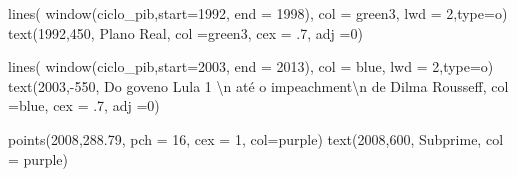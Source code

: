 \documentclass[
  letterpaper,
  DIV=11,
  numbers=noendperiod]{scrartcl}
\newenvironment{Shaded}{\begin{snugshade}}{\end{snugshade}}
\newcommand{\AttributeTok}[1]{\textcolor[rgb]{0.40,0.45,0.13}{#1}}
\newcommand{\DecValTok}[1]{\textcolor[rgb]{0.68,0.00,0.00}{#1}}
\newcommand{\FloatTok}[1]{\textcolor[rgb]{0.68,0.00,0.00}{#1}}
\newcommand{\FunctionTok}[1]{\textcolor[rgb]{0.28,0.35,0.67}{#1}}
\newcommand{\NormalTok}[1]{\textcolor[rgb]{0.00,0.23,0.31}{#1}}
\newcommand{\SpecialCharTok}[1]{\textcolor[rgb]{0.37,0.37,0.37}{#1}}
\newcommand{\StringTok}[1]{\textcolor[rgb]{0.13,0.47,0.30}{#1}}
\theoremstyle{definition}
\theoremstyle{definition}
\theoremstyle{plain}
\theoremstyle{plain}
\theoremstyle{remark}
\begin{document}
\begin{Shaded}
\begin{Highlighting}[]
\FunctionTok{lines}\NormalTok{( }\FunctionTok{window}\NormalTok{(ciclo\_pib,}\AttributeTok{start=}\DecValTok{1992}\NormalTok{, }\AttributeTok{end =} \DecValTok{1998}\NormalTok{), }\AttributeTok{col =} \StringTok{\textquotesingle{}green3\textquotesingle{}}\NormalTok{, }\AttributeTok{lwd =} \DecValTok{2}\NormalTok{,}\AttributeTok{type=}\StringTok{\textquotesingle{}o\textquotesingle{}}\NormalTok{)}
\FunctionTok{text}\NormalTok{(}\DecValTok{1992}\NormalTok{,}\DecValTok{450}\NormalTok{, }\StringTok{\textquotesingle{}Plano Real\textquotesingle{}}\NormalTok{, }\AttributeTok{col =}\StringTok{\textquotesingle{}green3\textquotesingle{}}\NormalTok{, }\AttributeTok{cex =}\NormalTok{ .}\DecValTok{7}\NormalTok{, }\AttributeTok{adj =}\DecValTok{0}\NormalTok{) }

\FunctionTok{lines}\NormalTok{( }\FunctionTok{window}\NormalTok{(ciclo\_pib,}\AttributeTok{start=}\DecValTok{2003}\NormalTok{, }\AttributeTok{end =} \DecValTok{2013}\NormalTok{), }\AttributeTok{col =} \StringTok{\textquotesingle{}blue\textquotesingle{}}\NormalTok{, }\AttributeTok{lwd =} \DecValTok{2}\NormalTok{,}\AttributeTok{type=}\StringTok{\textquotesingle{}o\textquotesingle{}}\NormalTok{)}
\FunctionTok{text}\NormalTok{(}\DecValTok{2003}\NormalTok{,}\SpecialCharTok{{-}}\DecValTok{550}\NormalTok{, }\StringTok{\textquotesingle{}Do goveno Lula 1 }\SpecialCharTok{\textbackslash{}n}\StringTok{  até o impeachment}\SpecialCharTok{\textbackslash{}n}\StringTok{ de Dilma Rousseff\textquotesingle{}}\NormalTok{, }\AttributeTok{col =}\StringTok{\textquotesingle{}blue\textquotesingle{}}\NormalTok{, }\AttributeTok{cex =}\NormalTok{ .}\DecValTok{7}\NormalTok{, }\AttributeTok{adj =}\DecValTok{0}\NormalTok{) }

\FunctionTok{points}\NormalTok{(}\DecValTok{2008}\NormalTok{,}\FloatTok{288.79}\NormalTok{, }\AttributeTok{pch =} \DecValTok{16}\NormalTok{, }\AttributeTok{cex =} \DecValTok{1}\NormalTok{, }\AttributeTok{col=}\StringTok{\textquotesingle{}purple\textquotesingle{}}\NormalTok{)}
\FunctionTok{text}\NormalTok{(}\DecValTok{2008}\NormalTok{,}\DecValTok{600}\NormalTok{, }\StringTok{\textquotesingle{}Subprime\textquotesingle{}}\NormalTok{, }\AttributeTok{col =} \StringTok{\textquotesingle{}purple\textquotesingle{}}\NormalTok{)}
\end{Highlighting}
\end{Shaded}
\end{document}
